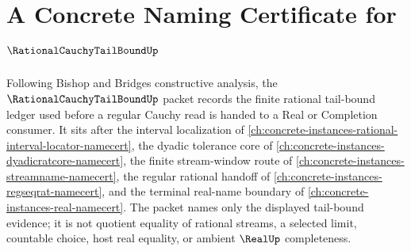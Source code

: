 \chapter{A Concrete Naming Certificate for $\RationalCauchyTailBoundUp$}
\label{ch:concrete-instances-rational-cauchy-tail-bound-namecert}

Following Bishop and Bridges constructive analysis, the $\RationalCauchyTailBoundUp$ packet records the finite rational tail-bound ledger used before a regular Cauchy read is handed to a Real or Completion consumer. It sits after the interval localization of \autoref{ch:concrete-instances-rational-interval-locator-namecert}, the dyadic tolerance core of \autoref{ch:concrete-instances-dyadicratcore-namecert}, the finite stream-window route of \autoref{ch:concrete-instances-streamname-namecert}, the regular rational handoff of \autoref{ch:concrete-instances-regseqrat-namecert}, and the terminal real-name boundary of \autoref{ch:concrete-instances-real-namecert}. The packet names only the displayed tail-bound evidence; it is not quotient equality of rational streams, a selected limit, countable choice, host real equality, or ambient $\RealUp$ completeness.

